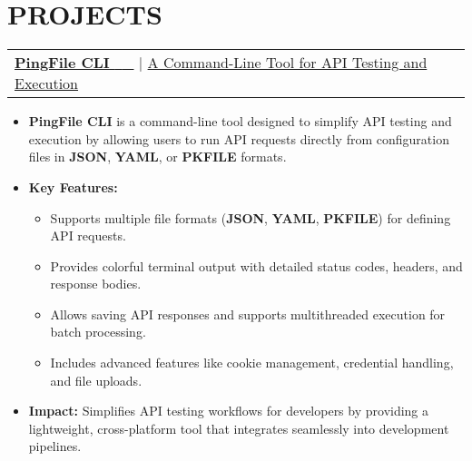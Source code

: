 \documentclass[letterpaper,11pt]{article}
\makeatletter
\newcommand{\resumeItem}[1]{
  \item\small{
    {#1 \vspace{-2pt}}
  }
}
\newcommand{\resumeProjectHeading}[2]{
    \item
    \begin{tabular*}{1.001\textwidth}{l@{\extracolsep{\fill}}r}
      \small#1 & \textbf{\small #2}\\
    \end{tabular*}\vspace{-7pt}
}
\newcommand{\resumeItemListStart}{\begin{itemize}}
\newcommand{\resumeItemListEnd}{\end{itemize}\vspace{-5pt}}
\makeatother
\begin{document}
\section{PROJECTS}
\vspace{-5pt}
    \resumeProjectHeading
          {\href{https://github.com/pradeepbgs/PingFile}{\textbf{\large{\underline{PingFile CLI}}} \href{https://github.com/pradeepbgs/PingFile}{
           \href{https://github.com/pradeepbgs/PingFile}{\raisebox{-0.2\height}\faGithub\ \underline{}} ~\raisebox{-0.1\height}\faExternalLink }} $|$ \large{\underline{A Command-Line Tool for API Testing and Execution}}}{}
           \vspace{-5pt}
         \resumeItemListStart
\resumeItem{\normalsize{
    \textbf{PingFile CLI} is a command-line tool designed to simplify API testing and execution by allowing users to run API requests directly from configuration files in \textbf{JSON}, \textbf{YAML}, or \textbf{PKFILE} formats.
}}
\resumeItem{\normalsize{
    \textbf{Key Features:}
    \begin{itemize}[leftmargin=0.25in, label={}]
        \item Supports multiple file formats (\textbf{JSON}, \textbf{YAML}, \textbf{PKFILE}) for defining API requests.
        \item Provides colorful terminal output with detailed status codes, headers, and response bodies.
        \item Allows saving API responses and supports multithreaded execution for batch processing.
        \item Includes advanced features like cookie management, credential handling, and file uploads.
    \end{itemize}
}}
\resumeItem{\normalsize{
    \textbf{Impact:} Simplifies API testing workflows for developers by providing a lightweight, cross-platform tool that integrates seamlessly into development pipelines.
}}
\resumeItemListEnd
\end{document}
